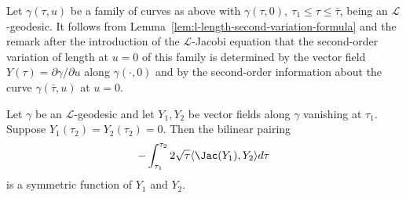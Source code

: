 \begin{remark}\label{rem:second-variation-determined-by-jacobi}
\label{variremark}
Let $\gamma(\tau,u)$ be a family of curves as above with
$\gamma(\tau,0),\ \tau_1\le \tau\le \bar \tau$, being an ${\mathcal
L}$-geodesic. It follows from Lemma~\ref{lem:l-length-second-variation-formula} and the remark
after the introduction of the ${\mathcal L}$-Jacobi equation that
the second-order variation of length at $u=0$ of this family is
determined by the vector field $Y(\tau)=\partial \gamma/\partial u$
along $\gamma(\cdot,0)$ and by the second-order information about
the curve $\gamma(\bar\tau,u)$ at $u=0$.
\end{remark}


\begin{corollary}\label{cor:l-jacobi-bilinear-symmetric}
\label{symmY}
Let $\gamma$ be an ${\mathcal L}$-geodesic and let $Y_1,Y_2$ be vector fields
along $\gamma$ vanishing at $\tau_1$. Suppose $Y_1(\tau_2)=Y_2(\tau_2)=0$.
 Then the
bilinear pairing
$$-\int_{\tau_1}^{\tau_2}2\sqrt{\tau}\langle
\Jac(Y_1),Y_2\rangle d\tau$$ is a symmetric function of $Y_1$
and $Y_2$.
\end{corollary}

